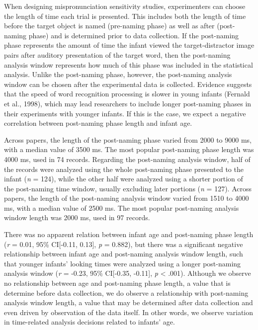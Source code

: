 \documentclass[man]{apa6}
\begin{document}
When designing mispronunciation sensitivity studies, experimenters can choose the length of time each trial is presented. This includes both the length of time before the target object is named (pre-naming phase) as well as after (post-naming phase) and is determined prior to data collection. If the post-naming phase represents the amount of time the infant viewed the target-distractor image pairs after auditory presentation of the target word, then the post-naming analysis window represents how much of this phase was included in the statistical analysis. Unlike the post-naming phase, however, the post-naming analysis window can be chosen after the experimental data is collected. Evidence suggests that the speed of word recognition processing is slower in young infants (Fernald et al., 1998), which may lead researchers to include longer post-naming phases in their experiments with younger infants. If this is the case, we expect a negative correlation between post-naming phase length and infant age.

Across papers, the length of the post-naming phase varied from 2000 to 9000 ms, with a median value of 3500 ms. The most popular post-naming phase length was 4000 ms, used in 74 records. Regarding the post-naming analysis window, half of the records were analyzed using the whole post-naming phase presented to the infant (\emph{n} = 124), while the other half were analyzed using a shorter portion of the post-naming time window, usually excluding later portions (\emph{n} = 127). Across papers, the length of the post-naming analysis window varied from 1510 to 4000 ms, with a median value of 2500 ms.
The most popular post-naming analysis window length was 2000 ms, used in 97 records.

There was no apparent relation between infant age and post-naming phase length (\emph{r} = 0.01, 95\% CI{[}-0.11, 0.13{]}, \emph{p} = 0.882), but there was a significant negative relationship between infant age and post-naming analysis window length, such that younger infants' looking times were analyzed using a longer post-naming analysis window (\emph{r} = -0.23, 95\% CI{[}-0.35, -0.11{]}, \emph{p} \textless{} .001). Although we observe no relationship between age and post-naming phase length, a value that is determine before data collection, we do observe a relationship with post-naming analysis window length, a value that may be determined after data collection and even driven by observation of the data itself. In other words, we observe variation in time-related analysis decisions related to infants' age.
\end{document}
